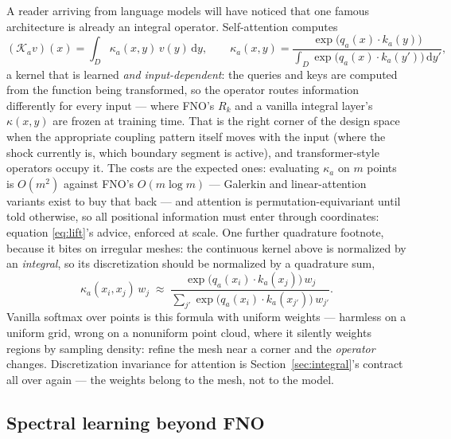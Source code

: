\documentclass[10pt,a4paper]{article}
\newcommand{\dd}{\mathrm{d}}
\newcommand{\K}{\mathcal{K}}
\begin{document}
A reader arriving from language models will have noticed that one famous
architecture is already an integral operator. Self-attention computes
\[
  (\K_a v)(x) = \int_D \kappa_a(x,y)\, v(y)\, \dd y,
  \qquad
  \kappa_a(x,y)
  = \frac{\exp\big(q_a(x) \cdot k_a(y)\big)}
         {\int_D \exp\big(q_a(x) \cdot k_a(y')\big)\, \dd y'},
\]
a kernel that is learned \emph{and input-dependent}: the queries and keys
are computed from the function being transformed, so the operator routes
information differently for every input --- where FNO's $R_k$ and a
vanilla integral layer's $\kappa(x,y)$ are frozen at training time. That
is the right corner of the design space when the appropriate coupling
pattern itself moves with the input (where the shock currently is, which
boundary segment is active), and transformer-style operators occupy it.
The costs are the expected ones: evaluating $\kappa_a$ on $m$ points is
$O(m^2)$ against FNO's $O(m \log m)$ --- Galerkin and linear-attention
variants exist to buy that back --- and attention is
permutation-equivariant until told otherwise, so all positional
information must enter through coordinates: equation \eqref{eq:lift}'s
advice, enforced at scale. One further quadrature footnote, because it
bites on irregular meshes: the continuous kernel above is normalized by
an \emph{integral}, so its discretization should be normalized by a
quadrature sum,
\[
  \kappa_a(x_i, x_j)\, w_j
  \;\approx\;
  \frac{\exp\big(q_a(x_i) \cdot k_a(x_j)\big)\, w_j}
       {\sum_{j'} \exp\big(q_a(x_i) \cdot k_a(x_{j'})\big)\, w_{j'}} .
\]
Vanilla softmax over points is this formula with uniform weights ---
harmless on a uniform grid, wrong on a nonuniform point cloud, where it
silently weights regions by sampling density: refine the mesh near a
corner and the \emph{operator} changes. Discretization invariance for
attention is Section~\ref{sec:integral}'s contract all over again ---
the weights belong to the mesh, not to the model.

\subsection{Spectral learning beyond FNO}
\end{document}
